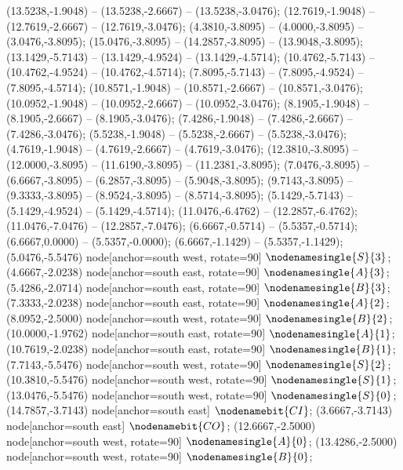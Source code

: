    (13.5238,-1.9048) -- (13.5238,-2.6667) -- (13.5238,-3.0476);
   (12.7619,-1.9048) -- (12.7619,-2.6667) -- (12.7619,-3.0476);
   (4.3810,-3.8095) -- (4.0000,-3.8095) -- (3.0476,-3.8095);
   (15.0476,-3.8095) -- (14.2857,-3.8095) -- (13.9048,-3.8095);
   (13.1429,-5.7143) -- (13.1429,-4.9524) -- (13.1429,-4.5714);
   (10.4762,-5.7143) -- (10.4762,-4.9524) -- (10.4762,-4.5714);
   (7.8095,-5.7143) -- (7.8095,-4.9524) -- (7.8095,-4.5714);
   (10.8571,-1.9048) -- (10.8571,-2.6667) -- (10.8571,-3.0476);
   (10.0952,-1.9048) -- (10.0952,-2.6667) -- (10.0952,-3.0476);
   (8.1905,-1.9048) -- (8.1905,-2.6667) -- (8.1905,-3.0476);
   (7.4286,-1.9048) -- (7.4286,-2.6667) -- (7.4286,-3.0476);
   (5.5238,-1.9048) -- (5.5238,-2.6667) -- (5.5238,-3.0476);
   (4.7619,-1.9048) -- (4.7619,-2.6667) -- (4.7619,-3.0476);
   (12.3810,-3.8095) -- (12.0000,-3.8095) -- (11.6190,-3.8095) -- (11.2381,-3.8095);
   (7.0476,-3.8095) -- (6.6667,-3.8095) -- (6.2857,-3.8095) -- (5.9048,-3.8095);
   (9.7143,-3.8095) -- (9.3333,-3.8095) -- (8.9524,-3.8095) -- (8.5714,-3.8095);
   (5.1429,-5.7143) -- (5.1429,-4.9524) -- (5.1429,-4.5714);
   (11.0476,-6.4762) -- (12.2857,-6.4762);
   (11.0476,-7.0476) -- (12.2857,-7.0476);
   (6.6667,-0.5714) -- (5.5357,-0.5714);
   (6.6667,0.0000) -- (5.5357,-0.0000);
   (6.6667,-1.1429) -- (5.5357,-1.1429);
   (5.0476,-5.5476) node[anchor=south west, rotate=90] {$\nodenamesingle{S}{3}$};
   (4.6667,-2.0238) node[anchor=south east, rotate=90] {$\nodenamesingle{A}{3}$};
   (5.4286,-2.0714) node[anchor=south east, rotate=90] {$\nodenamesingle{B}{3}$};
   (7.3333,-2.0238) node[anchor=south east, rotate=90] {$\nodenamesingle{A}{2}$};
   (8.0952,-2.5000) node[anchor=south west, rotate=90] {$\nodenamesingle{B}{2}$};
   (10.0000,-1.9762) node[anchor=south east, rotate=90] {$\nodenamesingle{A}{1}$};
   (10.7619,-2.0238) node[anchor=south east, rotate=90] {$\nodenamesingle{B}{1}$};
   (7.7143,-5.5476) node[anchor=south west, rotate=90] {$\nodenamesingle{S}{2}$};
   (10.3810,-5.5476) node[anchor=south west, rotate=90] {$\nodenamesingle{S}{1}$};
   (13.0476,-5.5476) node[anchor=south west, rotate=90] {$\nodenamesingle{S}{0}$};
   (14.7857,-3.7143) node[anchor=south east] {$\nodenamebit{CI}$};
   (3.6667,-3.7143) node[anchor=south east] {$\nodenamebit{CO}$};
   (12.6667,-2.5000) node[anchor=south west, rotate=90] {$\nodenamesingle{A}{0}$};
   (13.4286,-2.5000) node[anchor=south west, rotate=90] {$\nodenamesingle{B}{0}$};
